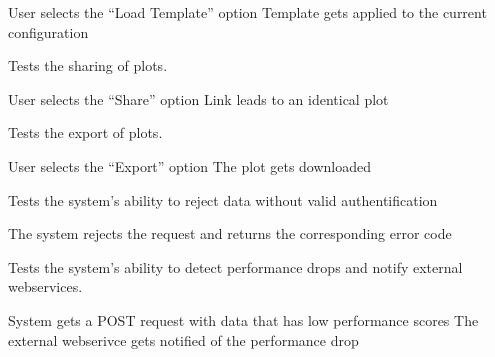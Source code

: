 {User selects the \enquote{Load Template} option}
{Template gets applied to the current configuration}


Tests the sharing of \glspl{plot}.

{User selects the \enquote{Share} option}
{Link leads to an identical \gls{plot}}


Tests the export of \glspl{plot}.

{User selects the \enquote{Export} option}
{The \gls{plot} gets downloaded}


Tests the system's ability to reject data without valid authentification

{The system rejects the request and returns the corresponding error code}


Tests the system's ability to detect performance drops and notify external webservices.

{System gets a POST request with data that has low performance scores}
{The external webserivce gets notified of the performance drop}
